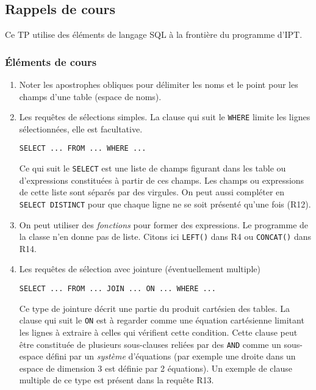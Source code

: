 \subsection*{Rappels de cours}
Ce TP utilise des éléments de langage SQL à la frontière du programme d'IPT. 
\subsubsection*{\'Eléments de cours}
\begin{enumerate}
  \item Noter les apostrophes obliques pour délimiter les noms et le point pour les champs d'une table (espace de noms).
  \item Les requêtes de sélections simples. La clause qui suit le \texttt{WHERE} limite les lignes sélectionnées, elle est facultative. 
\begin{verbatim}
SELECT ... FROM ... WHERE ...  
\end{verbatim}
Ce qui suit le \texttt{SELECT} est une liste de champs figurant dans les table ou d'expressions constituées à partir de ces champs. Les champs ou expressions de cette liste sont séparés par des virgules. On peut aussi compléter en \texttt{SELECT DISTINCT} pour que chaque ligne ne se soit présenté qu'une fois (R12).

\item On peut utiliser des \emph{fonctions} pour former des expressions. Le programme de la classe n'en donne pas de liste. Citons ici \texttt{LEFT()} dans R4 ou \texttt{CONCAT()} dans R14.

\item Les requêtes de sélection avec jointure (éventuellement multiple)
\begin{verbatim}
SELECT ... FROM ... JOIN ... ON ... WHERE ...  
\end{verbatim}
Ce type de jointure décrit une partie du produit cartésien des tables. La clause qui suit le \texttt{ON} est à regarder comme une équation cartésienne limitant les lignes à extraire à celles qui vérifient cette condition. Cette clause peut être constituée de plusieurs sous-clauses reliées par des \texttt{AND} comme un sous-espace défini par un \emph{système} d'équations (par exemple une droite dans un espace de dimension 3 est définie par 2 équations). Un exemple de clause multiple de ce type est présent dans la requête R13.


\end{enumerate}
